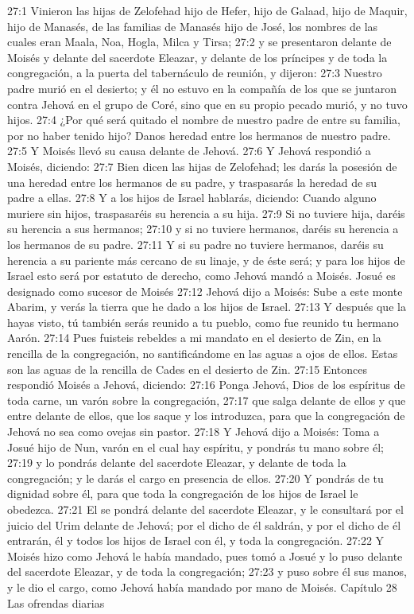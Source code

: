 27:1 Vinieron las hijas de Zelofehad hijo de Hefer, hijo de Galaad, hijo de Maquir, hijo de Manasés, de las familias de Manasés hijo de José, los nombres de las cuales eran Maala, Noa, Hogla, Milca y Tirsa;  
27:2 y se presentaron delante de Moisés y delante del sacerdote Eleazar, y delante de los príncipes y de toda la congregación, a la puerta del tabernáculo de reunión, y dijeron:  
27:3 Nuestro padre murió en el desierto; y él no estuvo en la compañía de los que se juntaron contra Jehová en el grupo de Coré, sino que en su propio pecado murió, y no tuvo hijos.  
27:4 ¿Por qué será quitado el nombre de nuestro padre de entre su familia, por no haber tenido hijo? Danos heredad entre los hermanos de nuestro padre.  
27:5 Y Moisés llevó su causa delante de Jehová.  
27:6 Y Jehová respondió a Moisés, diciendo:  
27:7 Bien dicen las hijas de Zelofehad; les darás la posesión de una heredad entre los hermanos de su padre, y traspasarás la heredad de su padre a ellas.  
27:8 Y a los hijos de Israel hablarás, diciendo: Cuando alguno muriere sin hijos, traspasaréis su herencia a su hija.  
27:9 Si no tuviere hija, daréis su herencia a sus hermanos;  
27:10 y si no tuviere hermanos, daréis su herencia a los hermanos de su padre.  
27:11 Y si su padre no tuviere hermanos, daréis su herencia a su pariente más cercano de su linaje, y de éste será; y para los hijos de Israel esto será por estatuto de derecho, como Jehová mandó a Moisés.  
Josué es designado como sucesor de Moisés  
27:12 Jehová dijo a Moisés: Sube a este monte Abarim, y verás la tierra que he dado a los hijos de Israel.  
27:13 Y después que la hayas visto, tú también serás reunido a tu pueblo, como fue reunido tu hermano Aarón.  
27:14 Pues fuisteis rebeldes a mi mandato en el desierto de Zin, en la rencilla de la congregación, no santificándome en las aguas a ojos de ellos. Estas son las aguas de la rencilla de Cades en el desierto de Zin.  
27:15 Entonces respondió Moisés a Jehová, diciendo:  
27:16 Ponga Jehová, Dios de los espíritus de toda carne, un varón sobre la congregación,  
27:17 que salga delante de ellos y que entre delante de ellos, que los saque y los introduzca, para que la congregación de Jehová no sea como ovejas sin pastor.  
27:18 Y Jehová dijo a Moisés: Toma a Josué hijo de Nun, varón en el cual hay espíritu, y pondrás tu mano sobre él;  
27:19 y lo pondrás delante del sacerdote Eleazar, y delante de toda la congregación; y le darás el cargo en presencia de ellos.  
27:20 Y pondrás de tu dignidad sobre él, para que toda la congregación de los hijos de Israel le obedezca.  
27:21 El se pondrá delante del sacerdote Eleazar, y le consultará por el juicio del Urim  delante de Jehová; por el dicho de él saldrán, y por el dicho de él entrarán, él y todos los hijos de Israel con él, y toda la congregación.  
27:22 Y Moisés hizo como Jehová le había mandado, pues tomó a Josué y lo puso delante del sacerdote Eleazar, y de toda la congregación;  
27:23 y puso sobre él sus manos, y le dio el cargo, como Jehová había mandado por mano de Moisés.  
Capítulo 28
Las ofrendas diarias   

